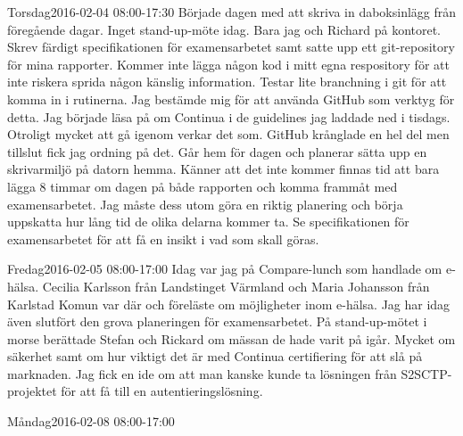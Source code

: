 \documentclass[a4paper,oneside]{book}
\begin{document}
\begin{diary}{Torsdag}{2016-02-04 08:00-17:30}
	Började dagen med att skriva in daboksinlägg från föregående dagar. Inget stand-up-möte idag. Bara jag och Richard på kontoret. Skrev färdigt specifikationen för examensarbetet samt satte upp ett git-repository för mina rapporter. Kommer inte lägga någon kod i mitt egna respository för att inte riskera sprida någon känslig information. Testar lite branchning i git för att komma in i rutinerna. Jag bestämde mig för att använda GitHub som verktyg för detta. Jag började läsa på om Continua i de guidelines jag laddade ned i tisdags. Otroligt mycket att gå igenom verkar det som. GitHub krånglade en hel del men tillslut fick jag ordning på det. Går hem för dagen och planerar sätta upp en skrivarmiljö på datorn hemma. Känner att det inte kommer finnas tid att bara lägga 8 timmar om dagen på både rapporten och komma frammåt med examensarbetet. Jag måste dess utom göra en riktig planering och börja uppskatta hur lång tid de olika delarna kommer ta. Se specifikationen för examensarbetet för att få en insikt i vad som skall göras.
\end{diary}

\begin{diary}{Fredag}{2016-02-05 08:00-17:00}
	Idag var jag på Compare-lunch som handlade om e-hälsa. Cecilia Karlsson från Landstinget Värmland och Maria Johansson från Karlstad Komun var där och föreläste om möjligheter inom e-hälsa. Jag har idag även slutfört den grova planeringen för examensarbetet. På stand-up-mötet i morse berättade Stefan och Rickard om mässan de hade varit på igår. Mycket om säkerhet samt om hur viktigt det är med Continua certifiering för att slå på marknaden. Jag fick en ide om att man kanske kunde ta lösningen från S2SCTP-projektet för att få till en autentieringslösning.
\end{diary}
\newpage

\begin{diary}{Måndag}{2016-02-08 08:00-17:00}
\lipsum[1]
\end{diary}
\end{document}
